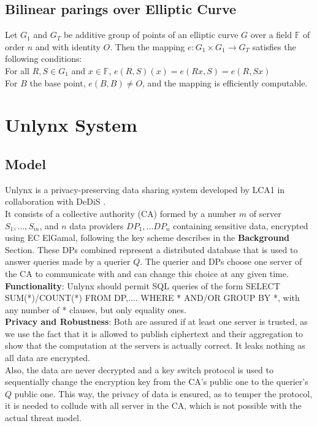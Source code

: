 \documentclass{article}
\begin{document}
\subsection*{Bilinear parings over Elliptic Curve}
Let $G_1$ and $G_T$ be additive group of points of an elliptic curve $G$ over a field $\mathbb{F}$ of order $n$ and with identity $O$. Then the mapping $e: G_1 \times G_1 \rightarrow G_T$ satisfies the following conditions:\\
For all $R,S \in G_1$ and $x \in \mathbb{F}$, $e(R,S)(x) = e(Rx,S) = e(R,Sx)$\\
For $B$ the base point, $e(B,B) \neq O$, and the mapping is efficiently computable.


\section{Unlynx System}
\subsection{Model}
Unlynx \cite{unlynx} is a privacy-preserving data sharing system developed by LCA1 \cite{lca} in collaboration with DeDiS \cite{dedis}.\\
It consists of a collective authority (CA) formed by a number $m$ of server $S_1,...,S_m$, and $n$ data providers $DP_1,...DP_n$ containing sensitive data, encrypted using EC ElGamal, following the key scheme describes in the \textbf{Background} Section. These DPs combined represent a distributed database that is used to answer queries made by a querier $Q$. The querier and DPs choose one server of the CA to communicate with and can change this choice at any given time.\\
\textbf{Functionality}: Unlynx should permit SQL queries of the form SELECT SUM(*)/COUNT(*) FROM DP,.... WHERE * AND/OR GROUP BY *, with any number of * clauses, but only equality ones.\\
\textbf{Privacy and Robustness}: Both are assured if at least one server is trusted, as we use the fact that it is allowed to publish ciphertext and their aggregation to show that the computation at the servers is actually correct. It leaks nothing as all data are encrypted.\\
Also, the data are never decrypted and a key switch protocol is used to sequentially change the encryption key from the CA's public one to the querier's $Q$ public one. This way, the privacy of data is ensured, as to temper the protocol, it is needed to collude with all server in the CA, which is not possible with the actual threat model.
\end{document}
